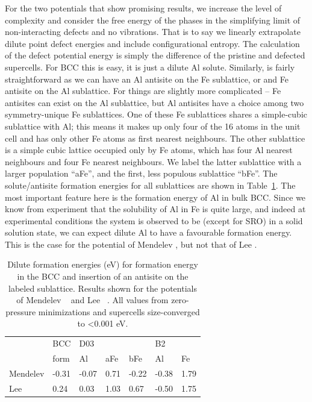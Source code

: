 For the two potentials that show promising results, we increase the level of complexity and consider the free energy of the phases in the simplifying limit of non-interacting defects and no vibrations.
That is to say we linearly extrapolate dilute point defect energies and include configurational entropy.
The calculation of the defect potential energy is simply the difference of the pristine and defected supercells.
For BCC this is easy, it is just a dilute Al solute.
Similarly, \BTWO is fairly straightforward as we can have an Al antisite on the Fe sublattice, or and Fe antisite on the Al sublattice.
For \DOTHREE things are slightly more complicated -- Fe antisites can exist on the Al sublattice, but Al antisites have a choice among two symmetry-unique Fe sublattices.
One of these Fe sublattices shares a simple-cubic sublattice with Al; this means it makes up only four of the 16 atoms in the \DOTHREE unit cell and has only other Fe atoms as first nearest neighbours.
The other sublattice is a simple cubic lattice occupied only by Fe atoms, which has four Al nearest neighbours and four Fe nearest neighbours.
We label the latter sublattice with a larger population ``aFe'', and the first, less populous sublattice ``bFe''.
The solute/antisite formation energies for all sublattices are shown in Table~\ref{tab:dilute}.
The most important feature here is the formation energy of Al in bulk BCC.
Since we know from experiment that the solubility of Al in Fe is quite large, and indeed at experimental conditions the system is observed to be (except for SRO) in a solid solution state, we can expect dilute Al to have a favourable formation energy.
This is the case for the potential of Mendelev \etal, but not that of Lee \etal.
%
\begin{table}[]
    \centering
    \label{tab:dilute}
    \begin{tabular}{l|l|lll|ll}
                 & BCC   & \multicolumn{3}{l|}{D03} & \multicolumn{2}{l}{B2} \\
                 & form  & Al      & aFe   & bFe    & Al         & Fe        \\ \hline
        Mendelev & -0.31 & -0.07   & 0.71  & -0.22  & -0.38      & 1.79      \\
        Lee      & 0.24  & 0.03    & 1.03  & 0.67   & -0.50      & 1.75
    \end{tabular}
    \caption{Dilute formation energies (eV) for formation energy in the BCC and insertion of an antisite on the labeled sublattice. Results shown for the potentials of Mendelev \etal~\cite{mendelev2005effect} and Lee \etal~\cite{lee2010modified}. All values from zero-pressure minimizations and supercells size-converged to <0.001 eV.}
\end{table}

